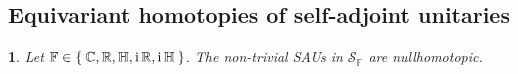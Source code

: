 \documentclass[a4paper,10pt]{article}
\numberwithin{equation}{section}
\theoremstyle{plain}
\theoremstyle{plain}
\newtheorem{lem}[thm]{\protect\lemmaname}
\theoremstyle{plain}
\theoremstyle{plain}
\theoremstyle{plain}
\theoremstyle{remark}
\theoremstyle{definition}
\theoremstyle{plain}
\providecommand{\lemmaname}{Lemma}
\newcommand{\ii}{\operatorname{i}}
\newcommand{\RR}{\mathbb{R}}
\newcommand{\CC}{\mathbb{C}}
\newcommand{\FF}{\mathbb{F}}
\newcommand{\calH}{\mathcal{H}}
\newcommand{\calP}{\mathcal{P}}
\newcommand{\calS}{\mathcal{S}}
\newcommand{\ip}[2]{\langle #1, #2 \rangle}
\newcommand{\HH}{\mathbb{H}}
\newcommand{\eq}[1]{\begin{align*}#1\end{align*}}
\begin{document}
		
		\subsection{Equivariant homotopies of self-adjoint unitaries}
		\begin{lem}\label{lem:classification of nontrivial projections}
			Let $\FF\in\Set{\CC,\RR,\HH,\ii\RR,\ii\HH}$. The non-trivial SAUs in $\calS_\FF$ are nullhomotopic.
		\end{lem}
\end{document}
